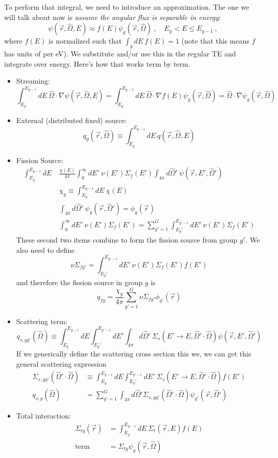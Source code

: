 \documentclass[12pt]{article}
\newcommand{\vOmega}{\ensuremath{\hat{\Omega}}}
\begin{document}
To perform that integral, we need to introduce an approximation. The one we will talk about now is \textit{assume the angular flux is separable in energy}:
\[
\psi(\vec{r}, \vOmega, E) \approx f(E)\psi_g(\vec{r}, \vOmega)\:, \quad E_g < E \leq E_{g-1}\:,
\]
where $f(E)$ is normalized such that $\int_g dE\: f(E) = 1$ (note that this means $f$ has units of per eV). We substitute and/or use this in the regular TE and integrate over energy. Here's how that works term by term.
%
\begin{itemize}
\item Streaming:
\[
\int_{E_g}^{E_{g-1}} dE\: \vOmega \cdot \nabla \psi(\vec{r}, \vOmega, E) = \int_{E_g}^{E_{g-1}} dE\: \vOmega \cdot \nabla f(E)\psi_g(\vec{r}, \vOmega) = \vOmega \cdot \nabla \psi_g(\vec{r}, \vOmega)
\]

\item External (distributed fixed) source:
\[q_{g}(\vec{r}, \vOmega) \equiv \int_{E_g}^{E_{g-1}} dE\: q(\vec{r}, \vOmega, E)\]

\item Fission Source:
\begin{align*}
\int_{E_g}^{E_{g-1}} dE\: &\frac{\chi(E)}{4 \pi}\int_0^{\infty} dE' \: \nu(E') \Sigma_f(E') \int_{4 \pi} d\vOmega' \:\psi(\vec{r}, E', \vOmega') \\
&\chi_g \equiv \int_{E_g}^{E_{g-1}} dE\: \chi(E) \\
& \int_{4 \pi} d\vOmega' \:\psi_g(\vec{r}, \vOmega') = \phi_g(\vec{r})\\
& \int_0^{\infty} dE' \: \nu(E') \Sigma_f(E') = \sum_{g'=1}^G \int_{E_g'}^{E_{g'-1}} dE'\: \nu(E') \Sigma_f(E')
\end{align*}
These second two items combine to form the fission source from group $g'$. We also need to define
\[
\nu\Sigma_{fg'} = \int_{E_g'}^{E_{g'-1}} dE'\: \nu(E') \Sigma_f(E') f(E')
\]
and therefore the fission source in group $g$ is
\[
q_{fg} = \frac{\chi_g}{4 \pi}\sum_{g'=1}^G \nu\Sigma_{fg'} \phi_{g'}(\vec{r})
\]

\item Scattering term:
\[
q_{s,gg'}(\vOmega) \equiv \int_{E_g}^{E_{g-1}} dE \int_{E_g'}^{E_{g'-1}} dE' \int_{4 \pi} d\vOmega' \: \Sigma_s(E'\rightarrow E, \vOmega' \cdot \vOmega) \psi(\vec{r}, E', \vOmega')
\]
If we generically define the scattering cross section this we, we can get this general scattering expression
\begin{align*}
\Sigma_{s,gg'}(\vOmega' \cdot \vOmega) & \equiv \int_{E_g}^{E_{g-1}} dE \int_{E_g'}^{E_{g'-1}} dE' \: \Sigma_s(E'\rightarrow E, \vOmega' \cdot \vOmega) f(E')\\
q_{s,g}(\vOmega) &= \sum_{g'=1}^G \int_{4 \pi} d\vOmega' \Sigma_{s,gg'}(\vOmega' \cdot \vOmega) \psi_{g'}(\vec{r}, \vOmega')
\end{align*}

\item Total interaction:
\begin{align*}
\Sigma_{tg}(\vec{r}) &= \int_{E_g}^{E_{g-1}} dE\: \Sigma_t(\vec{r}, E)f(E)\\
\text{term }&= \Sigma_{tg} \psi_g(\vec{r}, \vOmega)
\end{align*}

\end{itemize}
\end{document}
